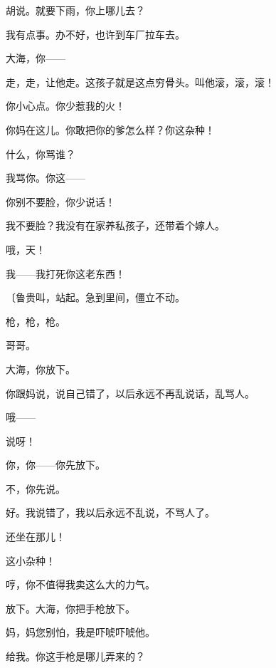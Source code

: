 胡说。就要下雨，你上哪儿去？

我有点事。办不好，也许到车厂拉车去。

大海，你——

走，走，让他走。这孩子就是这点穷骨头。叫他滚，滚，滚！

你小心点。你少惹我的火！

你妈在这儿。你敢把你的爹怎么样？你这杂种！

什么，你骂谁？

我骂你。你这——

你别不要脸，你少说话！

我不要脸？我没有在家养私孩子，还带着个嫁人。

哦，天！

我——我打死你这老东西！

{\fangsong〔鲁贵叫，站起。急到里间，僵立不动。}

枪，枪，枪。

哥哥。

大海，你放下。

你跟妈说，说自己错了，以后永远不再乱说话，乱骂人。

哦——

说呀！

你，你——你先放下。

不，你先说。

好。我说错了，我以后永远不乱说，不骂人了。

还坐在那儿！

这小杂种！

哼，你不值得我卖这么大的力气。

放下。大海，你把手枪放下。

妈，妈您别怕，我是吓唬吓唬他。

给我。你这手枪是哪儿弄来的？

